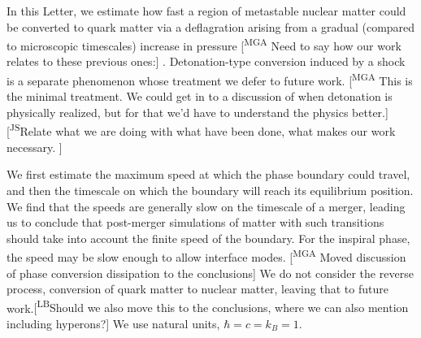 \documentclass[10pt,superscriptaddress,
amsmath,aps,prc,twocolumn,nofootinbib,floatfix]{revtex4-1}
\newcommand{\mga}[1]{{\color[rgb]{0.8,0,0}#1}}
\newcommand{\mgacom}[1]{\textsf{\color[rgb]{0.7,0,0}[\textsuperscript{MGA} #1]}}
\newcommand{\AH}[1]{{\color{cyan}#1}}
\newcommand{\LBcom}[1]{\textsf{\color{brown}[\textsuperscript{LB}#1]}}
\newcommand{\JS}[1]{{\color{violet}#1}}
\newcommand{\JScom}[1]{\textsf{\color{violet} [\textsuperscript{JS}#1]}}
\begin{document}

In this Letter, we estimate how fast a region of metastable nuclear matter could be converted to quark matter \mga{via a deflagration arising from a gradual (compared to microscopic timescales) increase in pressure  \mgacom{Need to say how our work relates to these previous ones:} \cite{Olinto:1986je,Niebergal:2010ds,Furusawa:2015vfn,Drago:2015fpa}. Detonation-type conversion induced by a shock is a separate phenomenon \cite{Furusawa:2015gjj} whose treatment we defer to future work.}
\mgacom{This is the minimal treatment. We could get in to a discussion of when detonation is physically realized, but for that we'd have to understand the physics better.}\JScom{Relate what we are doing with what have been done, what makes our work necessary. }

We first estimate the maximum speed at which the phase boundary could travel, and then the timescale on which the boundary will reach its equilibrium position. We find that the speeds are generally slow on the timescale of a merger, leading us to conclude that \mga{post-merger} simulations of matter with such transitions should take into account the finite speed of the boundary. 
\mga{For the inspiral phase, the speed may be slow enough to allow} interface modes. \mgacom{Moved discussion of phase conversion dissipation to the conclusions}
We do not consider the reverse process, conversion of quark matter to nuclear matter, %
leaving that to future work.\LBcom{Should we also move this to the conclusions, where we can also mention including hyperons?}
We use natural units, $\hbar=c=k_B=1$.


\end{document}
